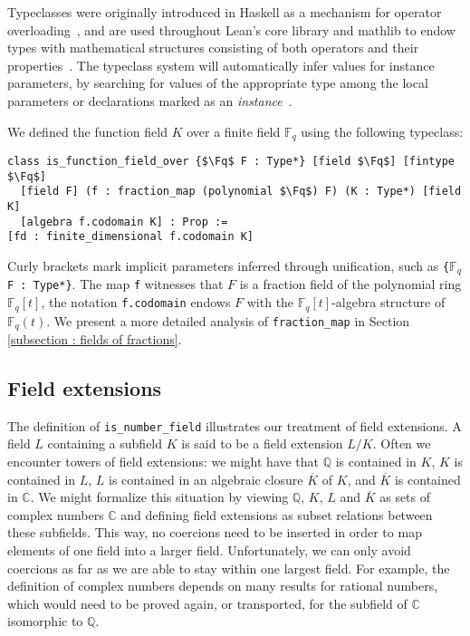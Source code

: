 \documentclass[a4paper,USenglish,cleveref, autoref, thm-restate]{lipics-v2021}
\newcommand{\C}{\mathbb{C}}
\newcommand{\lean}[1]{\texttt{#1}\xspace}
\newcommand*{\Fq}[1][q]{\mathbb{F}_{#1}}
\newcommand{\mathlib}{\textsf{mathlib}\xspace}
\newcommand{\Q}{\mathbb{Q}}
\begin{document}
Typeclasses were originally introduced in Haskell as a mechanism for operator overloading~\cite{typeclasses-haskell},
and are used throughout Lean's core library and \mathlib to endow types with mathematical structures consisting of both operators and their properties~\cite{mathlib}.
The typeclass system will automatically infer values for instance parameters,
by searching for values of the appropriate type among the local parameters or declarations marked as an \emph{instance}~\cite[\S 10]{theorem-proving-in-lean}.

We defined the function field $K$ over a finite field $\Fq$ using the following typeclass:
\begin{lstlisting}
class is_function_field_over {$\Fq$ F : Type*} [field $\Fq$] [fintype $\Fq$]
  [field F] (f : fraction_map (polynomial $\Fq$) F) (K : Type*) [field K]
  [algebra f.codomain K] : Prop :=
[fd : finite_dimensional f.codomain K]
\end{lstlisting}
Curly brackets mark implicit parameters inferred through unification, such as \lean{\{$\Fq$ F : Type*\}}.
The map \lean{f} witnesses that $F$ is a fraction field of the polynomial ring $\Fq[q][t]$,
the notation \lean{f.codomain} endows $F$ with the $\Fq[q][t]$-algebra structure of $\Fq(t)$. We present a more detailed analysis of \lean{fraction\_map} in Section \ref{subsection : fields of fractions}.

\subsection{Field extensions}

The definition of \lean{is\_number\_field} illustrates our treatment of field extensions.
A field $L$ containing a subfield $K$ is said to be a field extension $L / K$.
Often we encounter towers of field extensions: we might have that $\Q$ is contained in $K$, $K$ is contained in $L$, $L$ is contained in an algebraic closure $\overline{K}$ of $K$, and $\overline{K}$ is contained in $\C$.
We might formalize this situation by viewing $\Q$, $K$, $L$ and $\overline{K}$ as sets of complex numbers $\C$ and defining field extensions as subset relations between these subfields.
This way, no coercions need to be inserted in order to map elements of one field into a larger field.
Unfortunately, we can only avoid coercions as far as we are able to stay within one largest field.
For example, the definition of complex numbers depends on many results for rational numbers, which would need to be proved again, or transported, for the subfield of $\C$ isomorphic to $\Q$.
\end{document}

